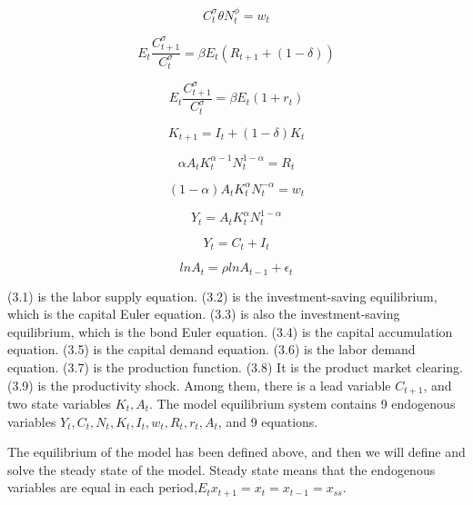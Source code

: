 \documentclass[10pt,math=newtx,citestyle=gb7714-2015,bibstyle=gb7714-2015]{elegantbook}
\begin{document}
	\begin{equation}\label{label}
		C_t^{\sigma}\theta N_t^{\phi}=w_t
	\end{equation}
	
	\begin{equation}\label{label}
		E_t\frac{C_{t+1}^{\sigma}}{C_t^{\sigma}}=\beta E_t(R_{t+1}+(1-\delta))
	\end{equation}
	
	\begin{equation}\label{label}
		E_t\frac{C_{t+1}^{\sigma}}{C_t^{\sigma}}=\beta E_t(1+r_t)
	\end{equation}
	
	\begin{equation}\label{label}
		K_{t+1}=I_t+(1-\delta)K_t
	\end{equation}
	
	\begin{equation}\label{label}
		\alpha A_tK_t^{\alpha-1}N_t^{1-\alpha}=R_t
	\end{equation}
	
	\begin{equation}\label{label}
		(1-\alpha)A_tK_t^{\alpha}N_t^{-\alpha}=w_t
	\end{equation}
	
	\begin{equation}\label{label}
		Y_t=A_tK_t^{\alpha}N_t^{1-\alpha}
	\end{equation}
	
	\begin{equation}\label{label}
		Y_t=C_t+I_t
	\end{equation}
	
	\begin{equation}\label{label}
		lnA_t=\rho lnA_{t-1}+\epsilon_t
	\end{equation}
	
	(3.1) is the labor supply equation. (3.2) is the investment-saving equilibrium, which is the capital Euler equation. (3.3) is also the investment-saving equilibrium, which is the bond Euler equation. (3.4) is the capital accumulation equation. (3.5) is the capital demand equation. (3.6) is the labor demand equation. (3.7) is the production function. (3.8) It is the product market clearing. (3.9) is the productivity shock. Among them, there is a lead variable $C_{t+1}$, and two state variables $K_t,A_t$. The model equilibrium system contains 9 endogenous variables $Y_t,C_t,N_t,K_t,I_t,w_t,R_t,r_t,A_t$, and 9 equations.
	
	
	The equilibrium of the model has been defined above, and then we will define and solve the steady state of the model. Steady state means that the endogenous variables are equal in each period,$E_tx_{t+1}=x_t=x_{t-1}=x_{ss}$.
	
\end{document}
